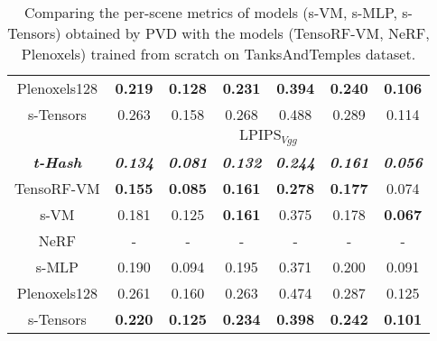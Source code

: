 \documentclass[letterpaper]{article} \usepackage{aaai23}  \usepackage{times}  \usepackage{helvet}  \usepackage{courier}  \usepackage[hyphens]{url}  \usepackage{graphicx} \urlstyle{rm} \def\UrlFont{\rm}  \usepackage{natbib}  \usepackage{caption} \frenchspacing  \setlength{\pdfpagewidth}{8.5in}  \setlength{\pdfpageheight}{11in}  \usepackage{multirow}
\begin{document}
\begin{table*}[t]
{\begin{tabular}{c|cccccc}
Plenoxels128             & \textbf{0.219}          & \textbf{0.128}          & \textbf{0.231}          & \textbf{0.394}          & \textbf{0.240}          & \textbf{0.106}          \\
s-Tensors                & 0.263                   & 0.158                   & 0.268                   & 0.488                   & 0.289                   & 0.114                   \\ \hline
                         & \multicolumn{6}{c}{$\text{LPIPS}_{Vgg}$}                                                                                                                             \\ \hline
\textit{\textbf{t-Hash}} & \textit{\textbf{0.134}} & \textit{\textbf{0.081}} & \textit{\textbf{0.132}} & \textit{\textbf{0.244}} & \textit{\textbf{0.161}} & \textit{\textbf{0.056}} \\
TensoRF-VM               & \textbf{0.155}          & \textbf{0.085}          & \textbf{0.161}          & \textbf{0.278}          & \textbf{0.177}          & 0.074                   \\
s-VM                     & 0.181                   & 0.125                   & \textbf{0.161}          & 0.375                   & 0.178                   & \textbf{0.067}          \\
NeRF                     & -                       & -                       & -                       & -                       & -                       & -                       \\
s-MLP                    & 0.190                   & 0.094                   & 0.195                   & 0.371                   & 0.200                   & 0.091                   \\
Plenoxels128             & 0.261                   & 0.160                   & 0.263                   & 0.474                   & 0.287                   & 0.125                   \\
s-Tensors                & \textbf{0.220}          & \textbf{0.125}          & \textbf{0.234}          & \textbf{0.398}          & \textbf{0.242}          & \textbf{0.101}          \\ \hline
\end{tabular}
}
\caption{Comparing the per-scene metrics of models (s-VM, s-MLP, s-Tensors) obtained by PVD with the models (TensoRF-VM, NeRF, Plenoxels) trained from scratch on TanksAndTemples dataset.}
\label{tab-gp2others-tanks}
\end{table*}
\end{document}
